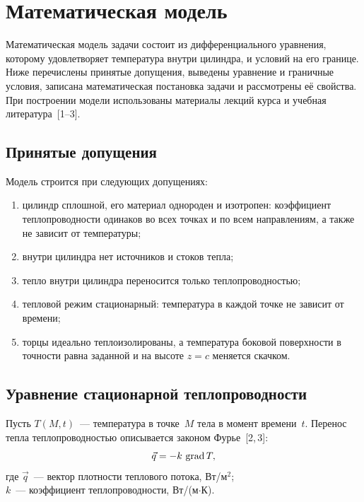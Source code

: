 \chapter{Математическая модель}
\label{ch:model}

Математическая модель задачи состоит из дифференциального уравнения,
которому удовлетворяет температура внутри цилиндра, и условий на его
границе. Ниже перечислены принятые допущения, выведены уравнение и
граничные условия, записана математическая постановка задачи и рассмотрены
её свойства. При построении модели использованы материалы лекций курса
и учебная литература~[1--3].

\section{Принятые допущения}
\label{sec:assumptions}

Модель строится при следующих допущениях:
\begin{enumerate}
  \item цилиндр сплошной, его материал однороден и изотропен: коэффициент
        теплопроводности одинаков во всех точках и по всем направлениям,
        а также не зависит от температуры;
  \item внутри цилиндра нет источников и стоков тепла;
  \item тепло внутри цилиндра переносится только теплопроводностью;
  \item тепловой режим стационарный: температура в каждой точке не зависит
        от времени;
  \item торцы идеально теплоизолированы, а температура боковой поверхности
        в точности равна заданной и на высоте $z=c$ меняется скачком.
\end{enumerate}

\section{Уравнение стационарной теплопроводности}
\label{sec:heat}

Пусть $T(M,t)$~— температура в точке~$M$ тела в момент времени~$t$.
Перенос тепла теплопроводностью описывается законом Фурье~[2,\,3]:
\begin{equation}
\label{eq:fourier}
\vec q=-k\,\Grad T,
\postdisplaypenalty=10000
\end{equation}
где $\vec q$~— вектор плотности теплового потока, Вт/м$^2$;\\
\hphantom{где }$k$~— коэффициент теплопроводности, Вт/(м$\cdot$К).


